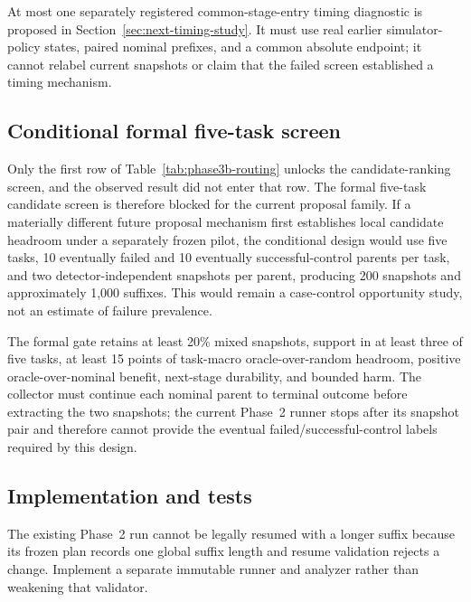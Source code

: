 At most one separately registered common-stage-entry timing diagnostic is proposed in Section~\ref{sec:next-timing-study}. It must use real earlier simulator-policy states, paired nominal prefixes, and a common absolute endpoint; it cannot relabel current snapshots or claim that the failed screen established a timing mechanism.

\subsection{Conditional formal five-task screen}

Only the first row of Table~\ref{tab:phase3b-routing} unlocks the candidate-ranking screen, and the observed result did not enter that row. The formal five-task candidate screen is therefore blocked for the current proposal family. If a materially different future proposal mechanism first establishes local candidate headroom under a separately frozen pilot, the conditional design would use five tasks, 10 eventually failed and 10 eventually successful-control parents per task, and two detector-independent snapshots per parent, producing 200 snapshots and approximately 1,000 suffixes. This would remain a case-control opportunity study, not an estimate of failure prevalence.

The formal gate retains at least 20\% mixed snapshots, support in at least three of five tasks, at least 15 points of task-macro oracle-over-random headroom, positive oracle-over-nominal benefit, next-stage durability, and bounded harm. The collector must continue each nominal parent to terminal outcome before extracting the two snapshots; the current Phase~2 runner stops after its snapshot pair and therefore cannot provide the eventual failed/successful-control labels required by this design.

\subsection{Implementation and tests}

The existing Phase~2 run cannot be legally resumed with a longer suffix because its frozen plan records one global suffix length and resume validation rejects a change. Implement a separate immutable runner and analyzer rather than weakening that validator.


